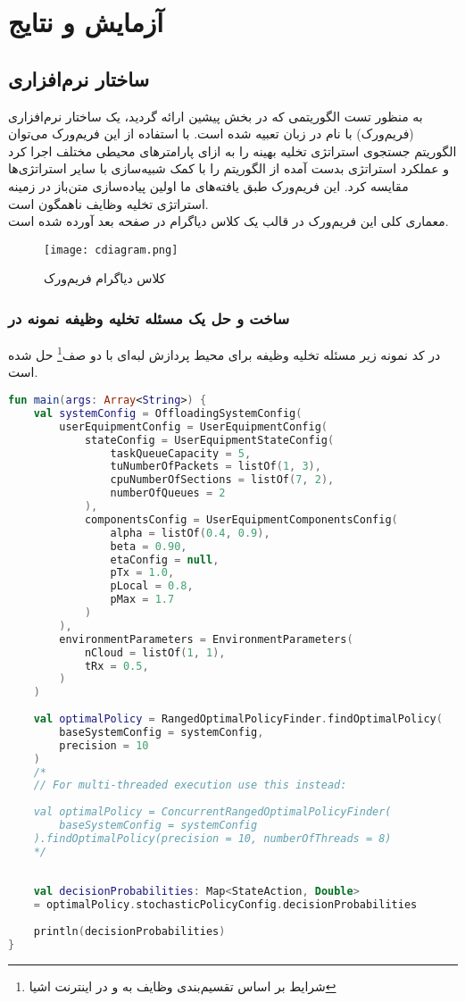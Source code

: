 \chapter{آزمایش و نتایج}
\section{ساختار نرم‌افزاری }
به منظور تست الگوریتمی که در بخش پیشین ارائه گردید، یک ساختار نرم‌افزاری (فریم‌ورک) با نام  در زبان  تعبیه شده است. با استفاده از این فریم‌ورک می‌توان الگوریتم جستجوی استراتژی تخلیه بهینه را به ازای پارامترهای محیطی مختلف اجرا کرد و عملکرد استراتژی بدست آمده از الگوریتم را با کمک شبیه‌سازی با سایر استراتژی‌ها مقایسه کرد. این فریم‌ورک طبق یافته‌های ما اولین پیاده‌سازی متن‌باز در زمینه استراتژی تخلیه وظایف ناهمگون است. \\

معماری کلی این فریم‌ورک در قالب یک کلاس دیاگرام در صفحه بعد آورده شده است.
\newpage
\begin{figure}[H]
	\texttt{[image: cdiagram.png]}
	\caption{کلاس دیاگرام فریم‌ورک }
\end{figure}
\newpage
\subsection{ساخت و حل یک مسئله تخلیه وظیفه نمونه در }
در کد نمونه زیر مسئله تخلیه وظیفه‌ برای محیط پردازش لبه‌ای با دو صف\footnote{شرایط بر اساس تقسیم‌بندی وظایف به  و  در اینترنت اشیا} حل شده است.
\begin{latin}
\begin{lstlisting}[language=Kotlin]
fun main(args: Array<String>) {
	val systemConfig = OffloadingSystemConfig(
		userEquipmentConfig = UserEquipmentConfig(
			stateConfig = UserEquipmentStateConfig(
				taskQueueCapacity = 5,
				tuNumberOfPackets = listOf(1, 3),
				cpuNumberOfSections = listOf(7, 2),
				numberOfQueues = 2
			),
			componentsConfig = UserEquipmentComponentsConfig(
				alpha = listOf(0.4, 0.9),
				beta = 0.90,
				etaConfig = null,
				pTx = 1.0,
				pLocal = 0.8,
				pMax = 1.7
			)
		),
		environmentParameters = EnvironmentParameters(
			nCloud = listOf(1, 1),
			tRx = 0.5,
		)
	)
	
	val optimalPolicy = RangedOptimalPolicyFinder.findOptimalPolicy(
		baseSystemConfig = systemConfig, 
		precision = 10
	)
	/*
	// For multi-threaded execution use this instead:
	
	val optimalPolicy = ConcurrentRangedOptimalPolicyFinder(
		baseSystemConfig = systemConfig
	).findOptimalPolicy(precision = 10, numberOfThreads = 8)
	*/
	
	
	val decisionProbabilities: Map<StateAction, Double>
	= optimalPolicy.stochasticPolicyConfig.decisionProbabilities
	
	println(decisionProbabilities)
}
\end{lstlisting}
\end{latin}
\newpage
